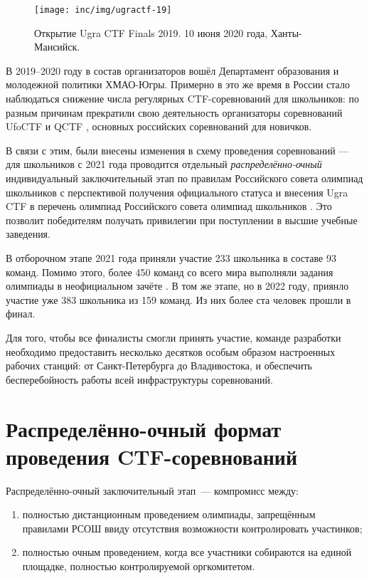 \begin{figure}[h]
  \centering
  \texttt{[image: inc/img/ugractf-19]}
  \caption{Открытие Ugra CTF Finals 2019. 10 июня 2020 года, Ханты-Мансийск.}
  \label{fig:ugractf-19}
\end{figure}


В 2019–2020 году в состав организаторов вошёл Департамент образования и молодежной политики ХМАО-Югры. Примерно в это же время в России стало наблюдаться снижение числа регулярных CTF-соревнований для школьников: по разным причинам прекратили свою деятельность организаторы соревнований UfoCTF и QCTF \cite{QCTF}, основных российских соревнований для новичков.

В связи с этим, были внесены изменения в схему проведения соревнований — для школьников с 2021 года проводится отдельный \textit{распределённо-очный} индивидуальный заключительный этап по правилам Российского совета олимпиад школьников с перспективой получения официального статуса и внесения Ugra CTF в перечень олимпиад Российского совета олимпиад школьников \cite{Rosolymp}. Это позволит победителям получать привилегии при поступлении в высшие учебные заведения.

В отборочном этапе 2021 года приняли участие 233 школьника в составе 93 команд. Помимо этого, более 450 команд со всего мира выполняли задания олимпиады в неофициальном зачёте \cite{UgraCTF}. В том же этапе, но в 2022 году, приянло участие уже 383 школьника из 159 команд. Из них более ста человек прошли в финал.

Для того, чтобы все финалисты смогли принять участие, команде разработки необходимо предоставить несколько десятков особым образом настроенных рабочих станций: от Санкт-Петербурга до Владивостока, и обеспечить бесперебойность работы всей инфраструктуры соревнований.


\section{Распределённо-очный формат проведения CTF-соревнований}
\label{cha:analysis:}


Распределённо-очный заключительный этап~--- компромисс между:
\begin{enumerate}
  \item полностью дистанционным проведением олимпиады, запрещённым правилами РСОШ ввиду отсутствия возможности контролировать участинков;
  \item полностью очным проведением, когда все участники собираются на единой площадке, полностью контролируемой оргкомитетом.
\end{enumerate}

